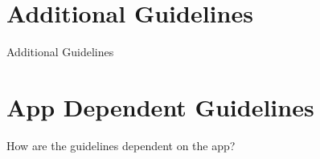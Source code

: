 \documentclass[
  10pt
, handout
]{beamer}
\begin{document}
\section{Additional Guidelines}  %

\begin{frame}{Additional Guidelines}
\end{frame}

\section{App Dependent Guidelines}  %

\begin{frame}{How are the guidelines dependent on the app?}
\end{frame}
\end{document}
